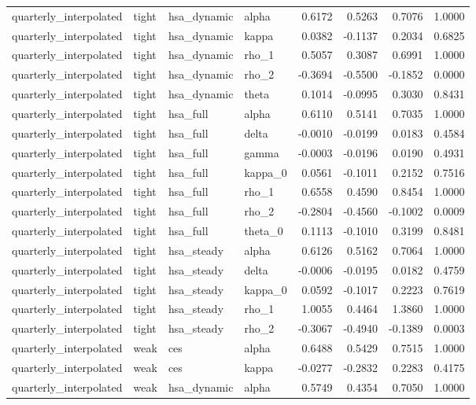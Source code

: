 \begin{tabular}{llllrrrr}
quarterly\_interpolated & tight & hsa\_dynamic & alpha & 0.6172 & 0.5263 & 0.7076 & 1.0000 \\
quarterly\_interpolated & tight & hsa\_dynamic & kappa & 0.0382 & -0.1137 & 0.2034 & 0.6825 \\
quarterly\_interpolated & tight & hsa\_dynamic & rho\_1 & 0.5057 & 0.3087 & 0.6991 & 1.0000 \\
quarterly\_interpolated & tight & hsa\_dynamic & rho\_2 & -0.3694 & -0.5500 & -0.1852 & 0.0000 \\
quarterly\_interpolated & tight & hsa\_dynamic & theta & 0.1014 & -0.0995 & 0.3030 & 0.8431 \\
quarterly\_interpolated & tight & hsa\_full & alpha & 0.6110 & 0.5141 & 0.7035 & 1.0000 \\
quarterly\_interpolated & tight & hsa\_full & delta & -0.0010 & -0.0199 & 0.0183 & 0.4584 \\
quarterly\_interpolated & tight & hsa\_full & gamma & -0.0003 & -0.0196 & 0.0190 & 0.4931 \\
quarterly\_interpolated & tight & hsa\_full & kappa\_0 & 0.0561 & -0.1011 & 0.2152 & 0.7516 \\
quarterly\_interpolated & tight & hsa\_full & rho\_1 & 0.6558 & 0.4590 & 0.8454 & 1.0000 \\
quarterly\_interpolated & tight & hsa\_full & rho\_2 & -0.2804 & -0.4560 & -0.1002 & 0.0009 \\
quarterly\_interpolated & tight & hsa\_full & theta\_0 & 0.1113 & -0.1010 & 0.3199 & 0.8481 \\
quarterly\_interpolated & tight & hsa\_steady & alpha & 0.6126 & 0.5162 & 0.7064 & 1.0000 \\
quarterly\_interpolated & tight & hsa\_steady & delta & -0.0006 & -0.0195 & 0.0182 & 0.4759 \\
quarterly\_interpolated & tight & hsa\_steady & kappa\_0 & 0.0592 & -0.1017 & 0.2223 & 0.7619 \\
quarterly\_interpolated & tight & hsa\_steady & rho\_1 & 1.0055 & 0.4464 & 1.3860 & 1.0000 \\
quarterly\_interpolated & tight & hsa\_steady & rho\_2 & -0.3067 & -0.4940 & -0.1389 & 0.0003 \\
quarterly\_interpolated & weak & ces & alpha & 0.6488 & 0.5429 & 0.7515 & 1.0000 \\
quarterly\_interpolated & weak & ces & kappa & -0.0277 & -0.2832 & 0.2283 & 0.4175 \\
quarterly\_interpolated & weak & hsa\_dynamic & alpha & 0.5749 & 0.4354 & 0.7050 & 1.0000 \\

\end{tabular}
